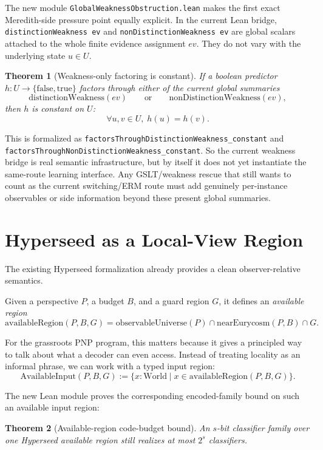 \documentclass[11pt]{article}
\newtheorem{theorem}{Theorem}[section]
\theoremstyle{remark}
\begin{document}
The new module \texttt{GlobalWeaknessObstruction.lean} makes the first exact
Meredith-side pressure point equally explicit.  In the current Lean bridge,
\texttt{distinctionWeakness ev} and \texttt{nonDistinctionWeakness ev} are
global scalars attached to the whole finite evidence assignment \(ev\).  They do
not vary with the underlying state \(u \in U\).

\begin{theorem}[Weakness-only factoring is constant]
If a boolean predictor \(h : U \to \{\mathrm{false},\mathrm{true}\}\) factors
through either of the current global summaries
\[
  \mathrm{distinctionWeakness}(ev)
  \qquad \text{or} \qquad
  \mathrm{nonDistinctionWeakness}(ev),
\]
then \(h\) is constant on \(U\):
\[
  \forall u,v \in U,\; h(u) = h(v).
\]
\end{theorem}

\noindent
This is formalized as
\texttt{factorsThroughDistinctionWeakness\_constant} and
\texttt{factorsThroughNonDistinctionWeakness\_constant}.  So the current
weakness bridge is real semantic infrastructure, but by itself it does not yet
instantiate the same-route learning interface.  Any GSLT/weakness rescue that
still wants to count as the current switching/ERM route must add genuinely
per-instance observables or side information beyond these present global
summaries.

\section{Hyperseed as a Local-View Region}

The existing Hyperseed formalization already provides a clean observer-relative
semantics.

Given a perspective \(P\), a budget \(B\), and a guard region \(G\), it defines
an \emph{available region}
\[
  \mathrm{availableRegion}(P,B,G)
  =
  \mathrm{observableUniverse}(P)
  \cap
  \mathrm{nearEurycosm}(P,B)
  \cap
  G.
\]

For the grassroots PNP program, this matters because it gives a principled way to
talk about what a decoder can even access.  Instead of treating locality as an
informal phrase, we can work with a typed input region:
\[
  \mathrm{AvailableInput}(P,B,G)
  := \{x : \mathrm{World} \mid x \in \mathrm{availableRegion}(P,B,G)\}.
\]

The new Lean module proves the corresponding encoded-family bound on such an
available input region:

\begin{theorem}[Available-region code-budget bound]
An \(s\)-bit classifier family over one Hyperseed available region still realizes
at most \(2^s\) classifiers.
\end{theorem}
\end{document}
